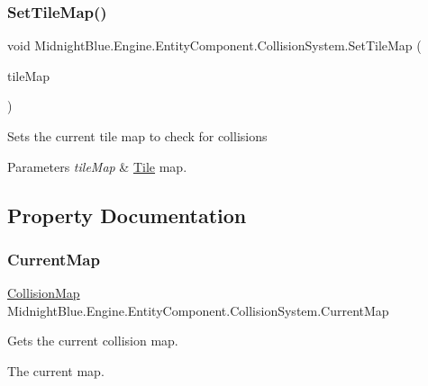 \subsubsection{\texorpdfstring{Set\+Tile\+Map()}{SetTileMap()}}
{\footnotesize\ttfamily void Midnight\+Blue.\+Engine.\+Entity\+Component.\+Collision\+System.\+Set\+Tile\+Map (\begin{DoxyParamCaption}\item[{\hyperlink{class_midnight_blue_1_1_engine_1_1_tiles_1_1_tile_map}{Tile\+Map}}]{tile\+Map }\end{DoxyParamCaption})\hspace{0.3cm}{\ttfamily [inline]}}



Sets the current tile map to check for collisions 


\begin{DoxyParams}{Parameters}
{\em tile\+Map} & \hyperlink{class_midnight_blue_1_1_tile}{Tile} map.\\
\hline
\end{DoxyParams}


\subsection{Property Documentation}
\hypertarget{class_midnight_blue_1_1_engine_1_1_entity_component_1_1_collision_system_a7467afd10338c1c475442d49d3ba0652}{}\label{class_midnight_blue_1_1_engine_1_1_entity_component_1_1_collision_system_a7467afd10338c1c475442d49d3ba0652} 
\subsubsection{\texorpdfstring{Current\+Map}{CurrentMap}}
{\footnotesize\ttfamily \hyperlink{class_midnight_blue_1_1_engine_1_1_collision_1_1_collision_map}{Collision\+Map} Midnight\+Blue.\+Engine.\+Entity\+Component.\+Collision\+System.\+Current\+Map\hspace{0.3cm}{\ttfamily [get]}}



Gets the current collision map. 

The current map.\hypertarget{class_midnight_blue_1_1_engine_1_1_entity_component_1_1_collision_system_a0375b2432a276123371e5616c51df971}{}\label{class_midnight_blue_1_1_engine_1_1_entity_component_1_1_collision_system_a0375b2432a276123371e5616c51df971} 
